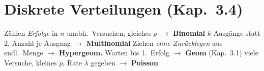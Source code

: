 \section{Diskrete Verteilungen (Kap.\ 3.4)}

\begin{merke}
\begin{itemize}
\pfeil Zählen \emph{Erfolge} in $n$ unabh.\ Versuchen, gleiches $p$ $\to$ \textbf{Binomial}
\pfeil $k$ Ausgänge statt 2, Anzahl je Ausgang $\to$ \textbf{Multinomial}
\pfeil Ziehen \emph{ohne Zurücklegen} aus endl.\ Menge $\to$ \textbf{Hypergeom.}
\pfeil Warten bis 1.\ Erfolg $\to$ \textbf{Geom} (Kap.\ 3.1)
\pfeil viele Versuche, kleines $p$, Rate $\lambda$ gegeben $\to$ \textbf{Poisson}
\end{itemize}
\end{merke}

